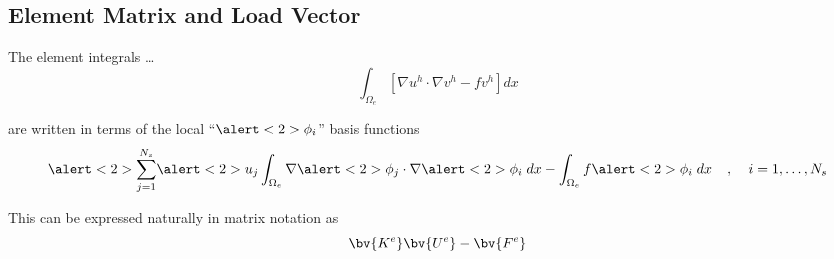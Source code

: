\subsection*{Element Matrix and Load Vector}
\begin{frame}%
  \begin{itemize}    
	{
	\item
	  {
	    The element integrals \ldots
	    \begin{equation}
	      \nonumber
	      \int_{\Omega_e} \left[ \nabla u^h \cdot \nabla v^h - fv^h \right] dx
	    \end{equation}
	  }
	}

	
      {
	\item{
	  are written in terms of the local ``$\alert<2>{\phi_i}$'' basis functions
	  \begin{equation}
	    \nonumber
		\alert<2>{\sum_{j=1}^{N_s}}  \alert<2>{u_j}   \int_{\Omega_e}
		\nabla \alert<2>{\phi_j} \cdot \nabla \alert<2>{\phi_i} \;dx
		- \int_{\Omega_e}  f\alert<2>{\phi_i} \;dx
		\hspace{.15in},\hspace{.15in} i = 1,\ldots,N_s
	  \end{equation}
	}
      }
      {
	\item{
	  This can be expressed naturally in matrix notation as
	\begin{equation}
	  \nonumber
	  \bv{K^e} \bv{U^e} - \bv{F^e} 
	\end{equation}
	}
      }
  \end{itemize}
 \end{frame}




